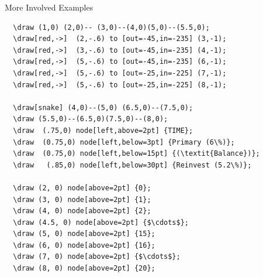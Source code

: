 \documentclass{beamer}\usepackage[]{graphicx}\usepackage[]{color}
\begin{document}
\begin{frame}[fragile]{More Involved Examples}
\begin{verbatim}
  \draw (1,0) (2,0)-- (3,0)--(4,0)(5,0)--(5.5,0);
  \draw[red,->]  (2,-.6) to [out=-45,in=-235] (3,-1);
  \draw[red,->]  (3,-.6) to [out=-45,in=-235] (4,-1);
  \draw[red,->]  (5,-.6) to [out=-45,in=-235] (6,-1);
  \draw[red,->]  (5,-.6) to [out=-25,in=-225] (7,-1);
  \draw[red,->]  (5,-.6) to [out=-25,in=-225] (8,-1);
       
  \draw[snake] (4,0)--(5,0) (6.5,0)--(7.5,0);   
  \draw (5.5,0)--(6.5,0)(7.5,0)--(8,0);
  \draw  (.75,0) node[left,above=2pt] {TIME};
  \draw  (0.75,0) node[left,below=3pt] {Primary (6\%)};
  \draw  (0.75,0) node[left,below=15pt] {(\textit{Balance})};
  \draw   (.85,0) node[left,below=30pt] {Reinvest (5.2\%)};
        
  \draw (2, 0) node[above=2pt] {0};
  \draw (3, 0) node[above=2pt] {1};
  \draw (4, 0) node[above=2pt] {2};
  \draw (4.5, 0) node[above=2pt] {$\cdots$};
  \draw (5, 0) node[above=2pt] {15};
  \draw (6, 0) node[above=2pt] {16};
  \draw (7, 0) node[above=2pt] {$\cdots$};
  \draw (8, 0) node[above=2pt] {20};
\end{verbatim}      
 
\end{frame}
\end{document}
